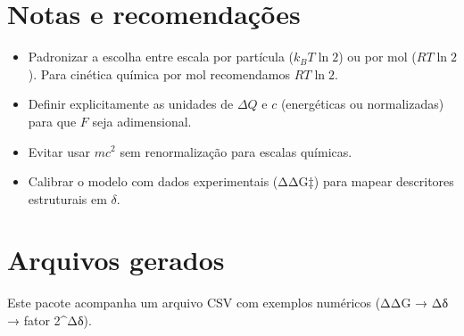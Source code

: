 \documentclass[a4paper,12pt]{article}
\begin{document}
\section{Notas e recomendações}
\begin{itemize}
  \item Padronizar a escolha entre escala por partícula ($k_{B}T\ln2$) ou por mol ($RT\ln2$). Para cinética química por mol recomendamos $RT\ln2$.
  \item Definir explicitamente as unidades de $\Delta Q$ e $c$ (energéticas ou normalizadas) para que $F$ seja adimensional.
  \item Evitar usar $mc^{2}$ sem renormalização para escalas químicas.
  \item Calibrar o modelo com dados experimentais (ΔΔG‡) para mapear descritores estruturais em $\delta$.
\end{itemize}

\section*{Arquivos gerados}
Este pacote acompanha um arquivo CSV com exemplos numéricos (ΔΔG → Δδ → fator 2^{Δδ}).
\end{document}

